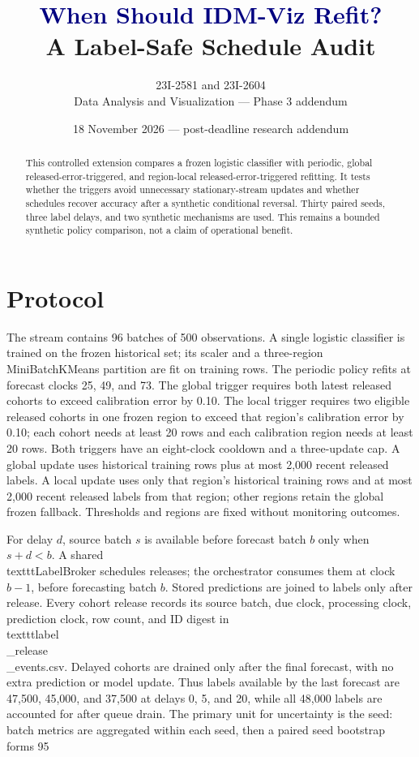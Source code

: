 \documentclass[10pt]{article}
\title{\textcolor{navy}{When Should IDM-Viz Refit?}\\[3pt]\large A Label-Safe Schedule Audit}
\author{23I-2581 and 23I-2604\\Data Analysis and Visualization --- Phase 3 addendum}
\date{18 November 2026 --- post-deadline research addendum}
\begin{document}
\maketitle
\begin{abstract}
This controlled extension compares a frozen logistic classifier with periodic, global released-error-triggered, and region-local released-error-triggered refitting. It tests whether the triggers avoid unnecessary stationary-stream updates and whether schedules recover accuracy after a synthetic conditional reversal. Thirty paired seeds, three label delays, and two synthetic mechanisms are used. This remains a bounded synthetic policy comparison, not a claim of operational benefit.
\end{abstract}
\section{Protocol}
The stream contains 96 batches of 500 observations. A single logistic classifier is trained on the frozen historical set; its scaler and a three-region MiniBatchKMeans partition are fit on training rows. The periodic policy refits at forecast clocks 25, 49, and 73. The global trigger requires both latest released cohorts to exceed calibration error by 0.10. The local trigger requires two eligible released cohorts in one frozen region to exceed that region's calibration error by 0.10; each cohort needs at least 20 rows and each calibration region needs at least 20 rows. Both triggers have an eight-clock cooldown and a three-update cap. A global update uses historical training rows plus at most 2,000 recent released labels. A local update uses only that region's historical training rows and at most 2,000 recent released labels from that region; other regions retain the global frozen fallback. Thresholds and regions are fixed without monitoring outcomes.

For delay $d$, source batch $s$ is available before forecast batch $b$ only when $s+d<b$. A shared \\texttt{LabelBroker} schedules releases; the orchestrator consumes them at clock $b-1$, before forecasting batch $b$. Stored predictions are joined to labels only after release. Every cohort release records its source batch, due clock, processing clock, prediction clock, row count, and ID digest in \\texttt{label\\_release\\_events.csv}. Delayed cohorts are drained only after the final forecast, with no extra prediction or model update. Thus labels available by the last forecast are 47,500, 45,000, and 37,500 at delays 0, 5, and 20, while all 48,000 labels are accounted for after queue drain. The primary unit for uncertainty is the seed: batch metrics are aggregated within each seed, then a paired seed bootstrap forms 95\\%
\end{document}
